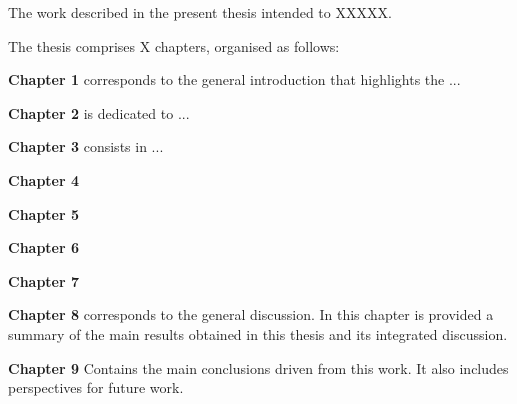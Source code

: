 The work described in the present thesis intended to XXXXX.

The thesis comprises X chapters, organised as follows:

\textbf{Chapter 1} corresponds to the general introduction that highlights the ...

\textbf{Chapter 2} is dedicated to ...

\textbf{Chapter 3} consists in ...

\textbf{Chapter 4}

\textbf{Chapter 5}

\textbf{Chapter 6}

\textbf{Chapter 7}

\textbf{Chapter 8} corresponds to the general discussion. In this chapter is provided a
summary of the main results obtained in this thesis and its integrated discussion. 

\textbf{Chapter 9} Contains the main conclusions driven from this work. It also includes perspectives for future work. 